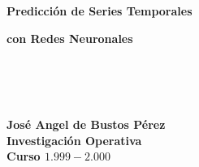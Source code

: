 \documentclass[a4paper,12pt]{report}
\begin{document}
\ \\ \\
\Huge
\textbf{Predicci\'on de Series Temporales}
\begin{center}
\textbf{con Redes Neuronales}
\end{center}
\ \\ \\

\begin{flushright}
\Large
\ \\
\textbf{Jos\'e Angel de Bustos P\'erez}\\
\textbf{Investigaci\'on Operativa}\\
\textbf{Curso $1.999-2.000$}
\end{flushright}

\normalsize

\thispagestyle{empty}

\tableofcontents
\listoffigures

%
%



%
%



%
%



%
%



%
%


\end{document}
